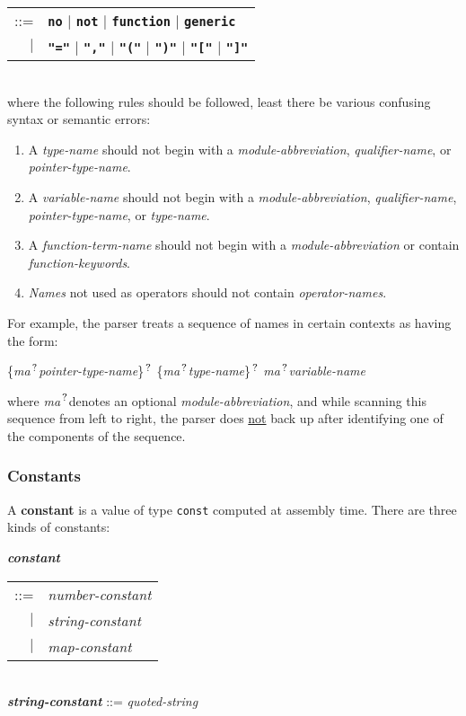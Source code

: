 \documentclass[12pt]{article}
\newcommand{\TT}[1]{{\tt \bfseries #1}}
\newcommand{\QMARK}{{$^{\,\mbox{\footnotesize ?}}$}}
\newcommand{\MA}{{\em ma}\QMARK}
\newcommand{\key}[1]{{\rm \bfseries #1}}
\newcommand{\emkey}[1]{{\em \bfseries #1}}
\newenvironment{indpar}[1][0.3in]%
	{\begin{list}{}%
		     {\setlength{\itemsep}{0in}%
		      \setlength{\topsep}{0in}%
		      \setlength{\parsep}{1ex}%
		      \setlength{\labelwidth}{#1}%
		      \setlength{\leftmargin}{#1}%
		      \addtolength{\leftmargin}{\labelsep}}%
	 \item}%
	{\end{list}}
\begin{document}
\begin{indpar}
\begin{tabular}[t]{rl}
    ::= & \TT{no} $|$ \TT{not} $|$ \TT{function} $|$ \TT{generic} \\
    $|$ & \TT{"="} $|$ \TT{","} $|$ \TT{"("} $|$ \TT{")"} $|$
          \TT{"["} $|$ \TT{"]"}
    \end{tabular}
\\[1ex]
where the following rules should be followed, least there be
various confusing syntax or semantic errors:
\begin{enumerate}
\item
A {\em type-name} should not begin with a {\em module-abbreviation},
{\em qualifier-name}, or {\em pointer-type-name}.
\item
\label{VARIABLE-NAME-RULE}
A {\em variable-name} should not begin with a {\em module-abbreviation},
{\em qualifier-name}, {\em pointer-type-name}, or {\em type-name}.
\item
A {\em function-term-name} should not begin with a {\em module-abbreviation}
or contain {\em function-keywords}.
\item
{\em Names} not used as operators should not contain {\em operator-names}.
\end{enumerate}
\end{indpar}

For example,
the parser treats a sequence of
names in certain contexts as having the form:
\begin{center}
\{\MA {\em pointer-type-name}\}\QMARK{}
\{\MA {\em type-name}\}\QMARK{}
\MA {\em variable-name}
\end{center}
where \MA denotes an optional {\em module-abbreviation},
and while scanning this sequence from left to right,
the parser does \underline{not} back up after identifying
one of the components of the sequence.

\subsubsection{Constants}
\label{CONSTANTS}

A \key{constant} is a value of type {\tt const} computed at
assembly time.  There are three kinds of constants:

\begin{indpar}
\emkey{constant}
    \begin{tabular}[t]{rl}
    ::= & {\em number-constant} \\
    $|$ & {\em string-constant} \\
    $|$ & {\em map-constant} \\
    \end{tabular} \\
\emkey{string-constant} ::= {\em quoted-string}
\end{indpar}
\end{document}
